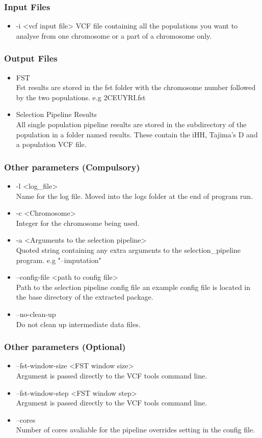 \documentclass[a4paper,10pt]{article}
\begin{document}
\subsubsection{Input Files}
\begin{itemize}
\item -i <vcf input file>
VCF file containing all the populations you want to analyse from one chromosome or a part of a chromosome only. 
\end{itemize}
\subsubsection{Output Files}
\begin{itemize}
\item FST \\
Fst results are stored in the fst folder with the chromosome number followed by the two populations. e.g 2CEUYRI.fst
\item Selection Pipeline Results\\
All single population pipeline results are stored in the subdirectory of the population in a folder named results. These contain the iHH, Tajima's D and a population VCF file.
\end{itemize}
\subsubsection{Other parameters (Compulsory)}
\begin{itemize}
\item -l <log\_file> \\
Name for the log file. Moved into the logs folder at the end of program run.
\item -c <Chromosome>\\
Integer for the chromosome being used.
\item -a <Arguments to the selection pipeline>\\
Quoted string containing any extra arguments to the selection\_pipeline program. e.g "--imputation"
\item --config-file <path to config file>\\
Path to the selection pipeline config file an example config file is located in the base directory of the extracted package.
\item --no-clean-up\\ 
Do not clean up intermediate data files.
\end{itemize}
\subsubsection{Other parameters (Optional)}
\begin{itemize}
\item --fst-window-size <FST window size>\\
Argument is passed directly to the VCF tools command line.
\item --fst-window-step <FST window step>\\
Argument is passed directly to the VCF tools command line.
\item --cores \\
Number of cores avaliable for the pipeline overrides setting in the config file.
\end{itemize}
\end{document}
